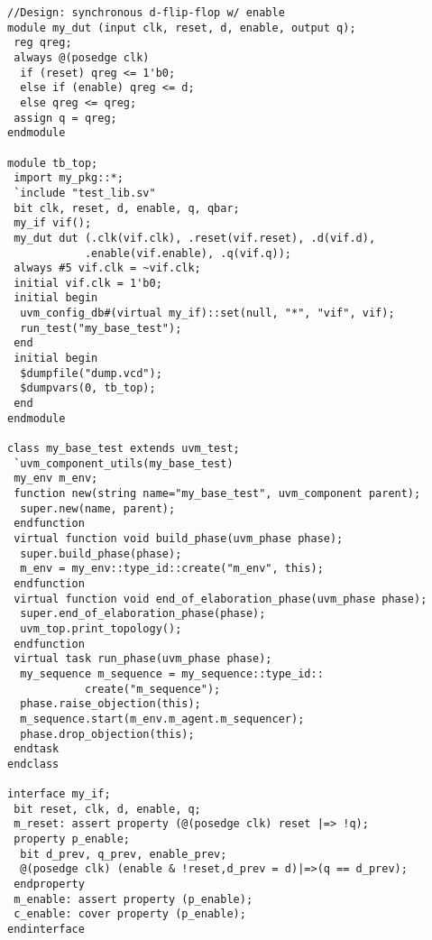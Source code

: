 \documentclass[conference]{IEEEtran}
\begin{document}
	

\let\thefootnote\relax{}
\begin{lstlisting}
//Design: synchronous d-flip-flop w/ enable  
module my_dut (input clk, reset, d, enable, output q); 
 reg qreg; 
 always @(posedge clk) 
  if (reset) qreg <= 1'b0; 
  else if (enable) qreg <= d; 
  else qreg <= qreg; 
 assign q = qreg; 
endmodule

module tb_top;
 import my_pkg::*;
 `include "test_lib.sv"
 bit clk, reset, d, enable, q, qbar;
 my_if vif();
 my_dut dut (.clk(vif.clk), .reset(vif.reset), .d(vif.d), 
			.enable(vif.enable), .q(vif.q));
 always #5 vif.clk = ~vif.clk;
 initial vif.clk = 1'b0;
 initial begin
  uvm_config_db#(virtual my_if)::set(null, "*", "vif", vif);
  run_test("my_base_test");
 end
 initial begin
  $dumpfile("dump.vcd");
  $dumpvars(0, tb_top);
 end
endmodule

class my_base_test extends uvm_test;
 `uvm_component_utils(my_base_test)
 my_env m_env;   
 function new(string name="my_base_test", uvm_component parent);
  super.new(name, parent);
 endfunction
 virtual function void build_phase(uvm_phase phase);
  super.build_phase(phase);
  m_env = my_env::type_id::create("m_env", this);
 endfunction
 virtual function void end_of_elaboration_phase(uvm_phase phase);
  super.end_of_elaboration_phase(phase);
  uvm_top.print_topology();
 endfunction
 virtual task run_phase(uvm_phase phase);
  my_sequence m_sequence = my_sequence::type_id::
  			create("m_sequence");
  phase.raise_objection(this);
  m_sequence.start(m_env.m_agent.m_sequencer);
  phase.drop_objection(this);
 endtask
endclass 

interface my_if;
 bit reset, clk, d, enable, q;
 m_reset: assert property (@(posedge clk) reset |=> !q);
 property p_enable;
  bit d_prev, q_prev, enable_prev;
  @(posedge clk) (enable & !reset,d_prev = d)|=>(q == d_prev);
 endproperty
 m_enable: assert property (p_enable);
 c_enable: cover property (p_enable); 
endinterface


\end{lstlisting}
\end{document}
